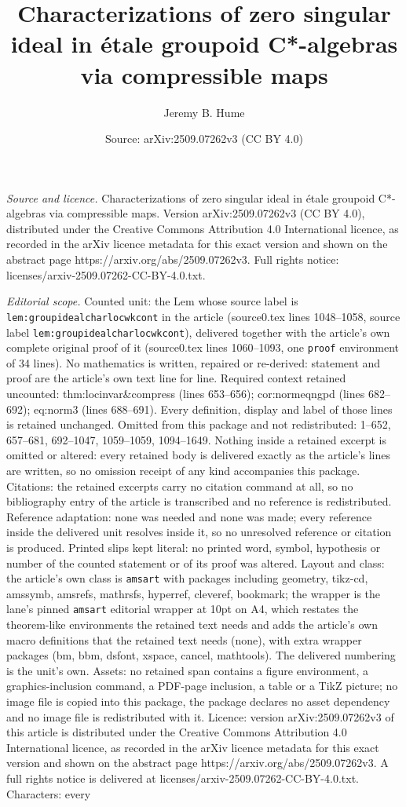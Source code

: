 \documentclass[10pt,a4paper]{amsart}
\title[Characterizations of zero singular ideal in \'etale groupoid]{Characterizations of zero singular ideal in \'etale groupoid C*-algebras via compressible maps}
\author{Jeremy B. Hume}
\date{Source: arXiv:2509.07262v3 (CC BY 4.0)}
\begin{document}
\maketitle

\noindent\emph{Source and licence.} Characterizations of zero singular ideal in \'etale groupoid C*-algebras via compressible maps. Version arXiv:2509.07262v3 (CC BY 4.0), distributed under the Creative Commons Attribution 4.0 International licence, as recorded in the arXiv licence metadata for this exact version and shown on the abstract page https://arxiv.org/abs/2509.07262v3. Full rights notice: licenses/arxiv-2509.07262-CC-BY-4.0.txt.\par\smallskip

\noindent\textit{Editorial scope.} Counted unit: the Lem whose source label is \texttt{lem:groupidealcharlocwkcont} in the article (source0.tex lines 1048--1058, source label \texttt{lem:groupidealcharlocwkcont}), delivered together with the article's own complete original proof of it (source0.tex lines 1060--1093, one \texttt{proof} environment of 34 lines). No mathematics is written, repaired or re-derived: statement and proof are the article's own text line for line. Required context retained uncounted: thm:locinvar\&compress (lines 653--656); cor:normeqngpd (lines 682--692); eq:norm3 (lines 688--691). Every definition, display and label of those lines is retained unchanged. Omitted from this package and not redistributed: 1--652, 657--681, 692--1047, 1059--1059, 1094--1649. Nothing inside a retained excerpt is omitted or altered: every retained body is delivered exactly as the article's lines are written, so no omission receipt of any kind accompanies this package. Citations: the retained excerpts carry no citation command at all, so no bibliography entry of the article is transcribed and no reference is redistributed. Reference adaptation: none was needed and none was made; every reference inside the delivered unit resolves inside it, so no unresolved reference or citation is produced. Printed slips kept literal: no printed word, symbol, hypothesis or number of the counted statement or of its proof was altered. Layout and class: the article's own class is \texttt{amsart} with packages including geometry, tikz-cd, amssymb, amsrefs, mathrsfs, hyperref, cleveref, bookmark; the wrapper is the lane's pinned \texttt{amsart} editorial wrapper at 10pt on A4, which restates the theorem-like environments the retained text needs and adds the article's own macro definitions that the retained text needs (none), with extra wrapper packages (bm, bbm, dsfont, xspace, cancel, mathtools). The delivered numbering is the unit's own. Assets: no retained span contains a figure environment, a graphics-inclusion command, a PDF-page inclusion, a table or a TikZ picture; no image file is copied into this package, the package declares no asset dependency and no image file is redistributed with it. Licence: version arXiv:2509.07262v3 of this article is distributed under the Creative Commons Attribution 4.0 International licence, as recorded in the arXiv licence metadata for this exact version and shown on the abstract page https://arxiv.org/abs/2509.07262v3. A full rights notice is delivered at licenses/arxiv-2509.07262-CC-BY-4.0.txt. Characters: every 
\end{document}
